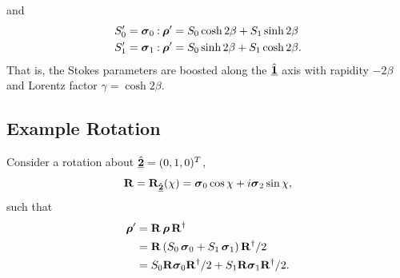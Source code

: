 and
\begin{equation}
\begin{split}
S_0' &= \pauli{0} \dcbo \cohM{\rho}' = S_0 \cosh 2\beta + S_1 \sinh 2\beta \\
S_1' &= \pauli{1} \dcbo \cohM{\rho}' = S_0 \sinh 2\beta + S_1 \cosh 2\beta. \label{eqn:Stokes_boost}
\end{split}
\end{equation}
That is, the Stokes parameters are boosted along the $\hat{\Pv{1}}$
axis with rapidity $-2\beta$ and Lorentz factor $\gamma = \cosh 2\beta.$

\subsection{Example Rotation}
\label{app:example_rotation}

\noindent
Consider a rotation about $\hat{\Pv{2}}=(0,1,0)^T$, 
$$\Rotation = \vRotation[2](\chi) =\pauli{0}\cos\chi+\Ci\pauli{2}\sin\chi,$$ 
%
such that
\begin{equation} \begin{split}
\cohM{\rho}' &= \Rotation \, \cohM{\rho} \, \Rotation^\dagger \\
&= \Rotation \left( S_0 \, \pauli{0}+S_1 \, \pauli{1} \right) \Rotation^\dagger / 2 \\
&= S_0 \Rotation \pauli{0} \Rotation^\dagger/2 +S_1 \Rotation \pauli{1} \Rotation^\dagger/2.
\end{split} \end{equation}

